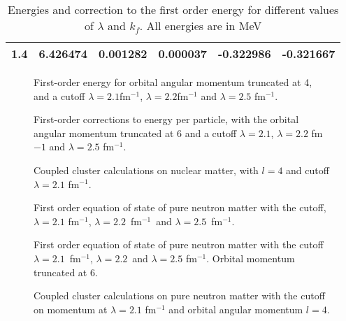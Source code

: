 \begin{table}
\begin{tabular}{|c|c|c|c|c|c|}
				\hline
				1.4 & 6.426474 & 0.001282 & 0.000037 & -0.322986 & -0.321667\\
				\hline
		\end{tabular}
		\caption{Energies and correction to the first order energy for different values of $\lambda$ and $k_f$. All energies are in MeV}
		\label{tab:korreksjoner}
\end{table}
\begin{figure}[htpb]
		
		\caption{First-order energy for orbital angular momentum truncated at 4, and a cutoff  $\lambda=2.1$fm$^{-1}$, $\lambda=2.2$fm$^{-1}$ and $\lambda=2.5$ fm$^{-1}$.}
		\label{fig:hf21}
\end{figure}
%		
\begin{figure}[htpb]
		
		\caption{First-order corrections to energy per particle, with the orbital angular momentum truncated at 6 and a cutoff $\lambda=2.1$, $\lambda=2.2$ fm$-1$ and $\lambda=2.5$ fm$^{-1}$.}
		\label{fig:hf23}
\end{figure}
\begin{figure}

\caption{Coupled cluster calculations on nuclear matter, with $l=4$ and cutoff $\lambda=2.1$ fm$^{-1}$.}
\label{fig:ccm_nucl_4_21}
\end{figure}
\begin{figure}

\caption{First order equation of state of pure neutron matter with the cutoff, $\lambda=2.1$ fm$^{-1}$, $\lambda=2.2$~fm$^{-1}$~and $\lambda=2.5$~fm$^{-1}$.}
\label{fig:first_neutron_l4}
\end{figure}
\begin{figure}

\caption{First order equation of state of pure neutron matter with the cutoff $\lambda=2.1$~fm$^{-1}$, $\lambda=2.2$~and $\lambda=2.5$ fm$^{-1}$. Orbital momentum truncated at 6.}
\label{fig:first_neutron_l6}
\end{figure}
%
\begin{figure}

\caption{Coupled cluster calculations on pure neutron matter with the cutoff on momentum at $\lambda=2.1$ fm$^{-1}$ and orbital angular momentum $l=4$.}
\label{fig:ccm_net_4_21}
\end{figure}



